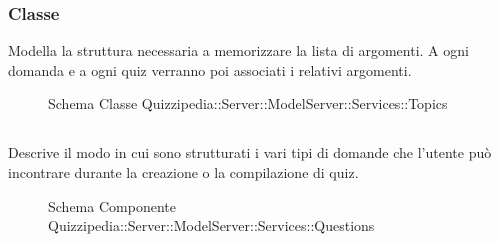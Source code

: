 \subsubsection{Classe }
Modella la struttura necessaria a memorizzare la lista di argomenti. A ogni domanda e a ogni quiz verranno poi associati i relativi argomenti.
\begin{figure}[H]
\centering
\noindent{}
\caption[Schema Classe Topics]{Schema Classe Quizzipedia::Server::ModelServer::Services::Topics}
\end{figure}
\subsection{}
Descrive il modo in cui sono strutturati i vari tipi di domande che l'utente può incontrare durante la creazione o la compilazione di quiz.
\begin{figure}[H]
\centering
\noindent{}
\caption[Schema Componente Quizzipedia::Server::ModelServer::Services::Questions]{Schema Componente Quizzipedia::Server::ModelServer::Services::Questions}
\end{figure}
